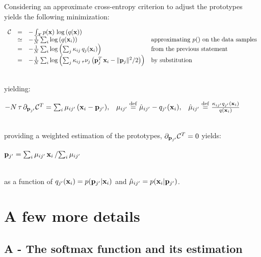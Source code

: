 \documentclass{article}\usepackage[width=17cm,height=22cm]{geometry}\usepackage[english]{babel} \usepackage[utf8]{inputenc}\usepackage{fancyvrb} \usepackage{authblk} \usepackage{amsmath}\usepackage{amsfonts} \usepackage{hyperref}\usepackage{outlines} \usepackage{graphicx} \usepackage{color}\DeclareGraphicsExtensions{.pdf,.png,.jpg}\definecolor{vthierry}{RGB}{80,0,120}\newcommand{\vthierry}[1]{{\color{vthierry}{#1}}}\definecolor{thalita}{RGB}{51, 153, 255}\newcommand{\thalita}[1]{{\color{thalita}{#1}}}
\newcommand{\deq}{\stackrel {\rm def}{=}} \newcommand{\eqline}[1]{\\\centerline{$#1$}\\}  \newcommand{\tab}{\hphantom{6mm}}
\begin{document}
Considering an approximate cross-entropy criterion to adjust the prototypes yields the following minimization:
\eqline{\begin{array}{rcll} {\cal C} 
&=& -\int_{\cal X} p({\bf x}) \, \log\left(q({\bf x})\right) \\
&\simeq& -\frac{1}{N} \sum_{i} \log\left(q({\bf x}_i)\right) & \mbox{approximating $p()$ on the data samples} \\
&=& -\frac{1}{N} \sum_{i} \log\left(\sum_j \kappa_{ij} \, q_j({\bf x}_i)\right) & \mbox{from the previous statement}\\
&=& -\frac{1}{N} \sum_{i} \log\left(\sum_j \kappa_{ij} \, {}_{\tau}\nu_j\left({\bf p}_j^T\,{\bf x}_i - \|{\bf p}_j\|^2/2\right)\right) & \mbox{by substitution}\\
\end{array}}
yielding:
\eqline{-N \, \tau \, \partial_{{\bf p}_{j'}} {\cal C}^T = \sum_{i} \mu_{ij'} \, ({\bf x}_i - {\bf p}_{j'}),\;\;\;  \mu_{ij'} \deq \hat{\mu}_{ij'} - q_{j'}({\bf x}_i),\;\;\; \hat{\mu}_{ij'} \deq \frac{\kappa_{ij'} q_{j'}({\bf x}_i)}{q({\bf x}_i)} }
providing a weighted estimation of the prototypes, $\partial_{{\bf p}_{j'}} {\cal C}^T = 0$ yields:
\eqline{{\bf p}_{j'} = \sum_i \mu_{ij'} \, {\bf x}_i \left/ \sum_i \mu_{ij'} \right.}
as a function of $q_{j'}({\bf x}_i) = p({\bf p}_{j'}|{\bf x}_i)$ and $\hat{\mu}_{ij'} = p({\bf x}_i|{\bf p}_{j'})$.

\clearpage \appendix \section*{A few more details}

\subsection*{A - The softmax function and its estimation}
\end{document}
